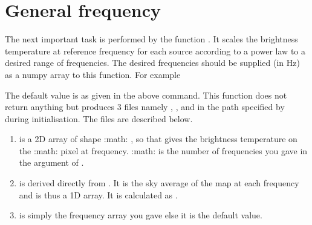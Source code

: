 \documentclass[letterpaper,10pt,english]{sphinxmanual}
\begin{document}
\section{General frequency}
\label{\detokenize{detexp:general-frequency}}
\sphinxAtStartPar
The next important task is performed by the function . It
scales the brightness temperature at reference frequency for each source
according to a power law to a desired range of frequencies. The desired
frequencies should be supplied (in Hz) as a numpy array to this
function. For example

\begin{sphinxVerbatim}[commandchars=\\\{\}]
  
\end{sphinxVerbatim}

\sphinxAtStartPar
The default value is as given in the above command. This function does
not return anything but produces 3 files namely ,
, and  in the path specified by
 during initialisation. The files are described below.
\begin{enumerate}
%
\item {} 
\sphinxAtStartPar
{} is a 2D array of shape :math: , so that  gives the brightness temperature
on the :math:  pixel at  frequency. :math:  is
the number of frequencies you gave in the argument of .

\item {} 
\sphinxAtStartPar
{} is derived directly from . It is the sky
average of the map at each frequency and is thus a 1D array. It is
calculated as .

\item {} 
\sphinxAtStartPar
{} is simply the frequency array you gave else it is the
default value.

\end{enumerate}
\end{document}
